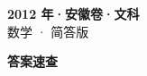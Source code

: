 \documentclass[zihao=-4, a4paper]{ctexart}
\begin{document}
\begin{center}
  {\Large\bfseries 2012 年·安徽卷·文科}\\[4pt]
  {\large 数学 · 简答版}
\end{center}
\medskip
{}

\clearpage
{}
\begin{center}{\Large\bfseries 答案速查}\end{center}
\medskip

\end{document}
